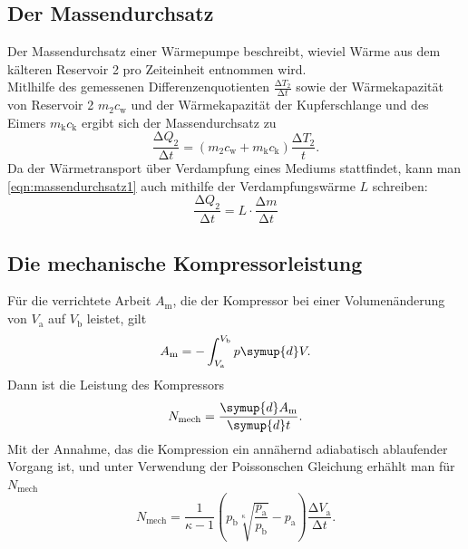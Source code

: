 \documentclass{scrartcl} %
\begin{document}
	\subsection{Der Massendurchsatz}
	Der Massendurchsatz einer Wärmepumpe beschreibt, wieviel Wärme aus dem kälteren Reservoir 2 pro Zeiteinheit entnommen wird. \\
	Mitlhilfe des gemessenen Differenzenquotienten $ \frac{\increment T_\text{2}}{\increment t}$ sowie der Wärmekapazität von Reservoir 2
	$m_\text{2}c_\text{w}$ und der Wärmekapazität der Kupferschlange und des Eimers $m_\text{k}c_\text{k}$ ergibt sich der Massendurchsatz
	zu
	\begin{equation}
		\frac{\increment Q_\text{2}}{\increment t} = (m_\text{2} c_\text{w} + m_\text{k} c_\text{k}) \frac{\increment T_\text{2}}{t}.
		\label{eqn:massendurchsatz1}
	\end{equation}
	Da der Wärmetransport über Verdampfung eines Mediums stattfindet, kann man \eqref{eqn:massendurchsatz1} auch mithilfe der
	Verdampfungswärme $L$ schreiben:
	\begin{equation}
		\frac{\increment Q_\text{2}}{\increment t} = L \cdot \frac{\increment m}{\increment t}
		\label{eqn:massendurchsatz2}
	\end{equation}
  \subsection{Die mechanische Kompressorleistung}
  Für die verrichtete Arbeit $A_\text{m}$, die der Kompressor bei einer Volumenänderung von $V_\text{a}$ auf $V_\text{b}$ leistet, gilt
  \begin{equation}
    A_\text{m} = -\int_{V_\text{a}}^{V_\text{b}} p \symup{d}V.
  \label{eqn:arbeitkompressor}
  \end{equation}
  Dann ist die Leistung des Kompressors
  \begin{equation}
    N_\text{mech} = \frac{\symup{d} A_\text{m}}{\symup{d} t}.
    \label{eqn:leistungkompressor1}
  \end{equation}
  Mit der Annahme, das die Kompression ein annähernd adiabatisch ablaufender Vorgang ist, und unter Verwendung der Poissonschen Gleichung erhählt man für $N_\text{mech}$
  \begin{equation}
    N_\text{mech} = \frac{1}{\kappa - 1}  \left(p_\text{b} \sqrt[\kappa]{\frac{p_\text{a}}{p_\text{b}}} - p_\text{a} \right)  \frac{\increment V_\text{a}}{\increment t}.
    \label{eqn:leistungkompressor2}
  \end{equation}
\end{document}
